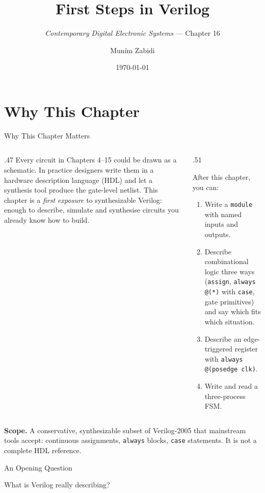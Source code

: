 \documentclass[9pt,aspectratio=169,xcolor=table]{beamer}
\title{First Steps in Verilog}
\subtitle{\emph{Contemporary Digital Electronic Systems} --- Chapter 16}
\author{Mun\'{i}m Zabidi}
\institute{\color{primary}Faculty of Electrical Engineering, Universiti Teknologi Malaysia}
\date{\today}
\begin{document}
\titlepage

\section{Why This Chapter}

\begin{frame}{Why This Chapter Matters}
  \begin{columns}[c]
  \begin{column}{.47\textwidth}
    Every circuit in Chapters 4--15 could be drawn as a schematic. In practice designers write them in a \alert{hardware description language} (HDL) and let a synthesis tool produce the gate-level netlist. This chapter is a \emph{first exposure} to synthesizable Verilog: enough to describe, simulate and synthesise circuits you already know how to build.
  \end{column}
  \begin{column}{.51\textwidth}
    \begin{block}{After this chapter, you can:}
    {\small
    \begin{enumerate}\itemsep2pt
      \item Write a \texttt{module} with named inputs and outputs.
      \item Describe combinational logic three ways (\texttt{assign}, \texttt{always @(*)} with \texttt{case}, gate primitives) and say which fits which situation.
      \item Describe an edge-triggered register with \texttt{always @(posedge clk)}.
      \item Write and read a three-process FSM.
    \end{enumerate}}
    \end{block}
  \end{column}
  \end{columns}
  \vspace{1mm}
  {\footnotesize \textbf{Scope.} A conservative, synthesizable subset of Verilog-2005 that mainstream tools accept: continuous assignments, \texttt{always} blocks, \texttt{case} statements. It is not a complete HDL reference.}
\end{frame}

\begin{frame}{An Opening Question}
  \leavevmode\vspace{4mm}
  \begin{center}
  \end{center}
  \vspace{4mm}
  What is Verilog really describing?
\end{frame}
\end{document}
